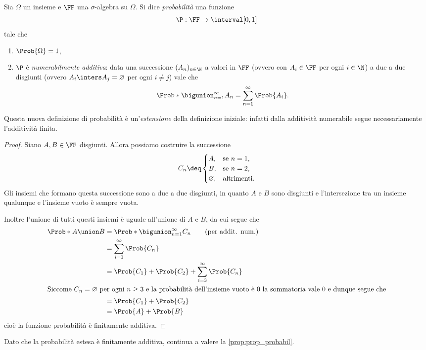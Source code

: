 \begin{definition}
    [Probabilità]
    Sia $\Omega$ un insieme e $\FF$ una $\sigma$-algebra su $\Omega$. Si dice \emph{probabilità} una funzione \[
        \P : \FF \to \interval[{0,1}]    
    \] tale che \begin{enumerate}[label={(\roman*)}]
        \item $\Prob{\Omega} = 1$,
        \item \label{def:prob_numerab_add} $\P$ è \emph{numerabilmente additiva}: data una successione $(A_n)_{n\in\N}$ a valori in $\FF$ (ovvero con $A_i \in \FF$ per ogni $i \in \N$) a due a due disgiunti (ovvero $A_i \inters A_j = \varnothing$ per ogni $i \neq j$) vale che \[
            \Prob*{\bigunion_{n = 1}^{\infty} A_n} 
            = \sum_{n = 1}^{\infty} \Prob{A_i}.
        \]
    \end{enumerate}
\end{definition}

\begin{remark}
    Questa nuova definizione di probabilità è un'\emph{estensione} della definizione iniziale: infatti dalla additività numerabile segue necessariamente l'additività finita.
\end{remark}
\begin{proof}
    Siano $A, B \in \FF$ disgiunti. Allora possiamo costruire la successione \[
        C_n \deq \begin{cases}
            A, &\text{se } n = 1, \\
            B, &\text{se } n = 2, \\
            \varnothing, &\text{altrimenti.}
        \end{cases}
    \] Gli insiemi che formano questa successione sono a due a due disgiunti, in quanto $A$ e $B$ sono disgiunti e l'intersezione tra un insieme qualunque e l'insieme vuoto è sempre vuota.

    Inoltre l'unione di tutti questi insiemi è uguale all'unione di $A$ e $B$, da cui segue che \begin{align*}
        \Prob*{A \union B} &= \Prob*{\bigunion_{n = 1}^\infty C_n} \tag{per addit. num.}\\
        &= \sum_{i=1}^\infty \Prob{C_n} \\
        &= \Prob{C_1} + \Prob{C_2} + \sum_{i=3}^\infty \Prob{C_n}\\
        \intertext{Siccome $C_n = \varnothing$ per ogni $n \geq 3$ e la probabilità dell'insieme vuoto è $0$ la sommatoria vale $0$ e dunque segue che}
        &= \Prob{C_1} + \Prob{C_2}\\
        &= \Prob{A} + \Prob{B}
    \end{align*} cioè la funzione probabilità è finitamente additiva.
\end{proof}
\begin{remark}
    Dato che la probabilità estesa è finitamente additiva, continua a valere la \autoref{prop:prop_probabil}.
\end{remark}

